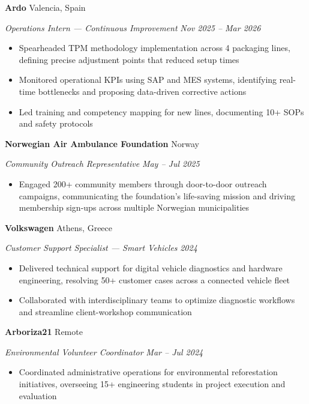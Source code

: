 \documentclass[11pt,letterpaper]{article}
\newcommand{\entry}[4]{%
  \noindent\textbf{#1} \hfill #2 \par\nopagebreak
  \textit{#3} \hfill \textit{#4} \par\nopagebreak
}
\begin{document}
\entry{Ardo}{Valencia, Spain}{Operations Intern --- Continuous Improvement}{Nov 2025 -- Mar 2026}
\begin{itemize}
  \item Spearheaded TPM methodology implementation across 4 packaging lines, defining precise adjustment points that reduced setup times
  \item Monitored operational KPIs using SAP and MES systems, identifying real-time bottlenecks and proposing data-driven corrective actions
  \item Led training and competency mapping for new lines, documenting 10+ SOPs and safety protocols
\end{itemize}
\vspace{0.3em}

\entry{Norwegian Air Ambulance Foundation}{Norway}{Community Outreach Representative}{May -- Jul 2025}
\begin{itemize}
  \item Engaged 200+ community members through door-to-door outreach campaigns, communicating the foundation's life-saving mission and driving membership sign-ups across multiple Norwegian municipalities
\end{itemize}
\vspace{0.3em}

\entry{Volkswagen}{Athens, Greece}{Customer Support Specialist --- Smart Vehicles}{2024}
\begin{itemize}
  \item Delivered technical support for digital vehicle diagnostics and hardware engineering, resolving 50+ customer cases across a connected vehicle fleet
  \item Collaborated with interdisciplinary teams to optimize diagnostic workflows and streamline client-workshop communication
\end{itemize}
\vspace{0.3em}

\entry{Arboriza21}{Remote}{Environmental Volunteer Coordinator}{Mar -- Jul 2024}
\begin{itemize}
  \item Coordinated administrative operations for environmental reforestation initiatives, overseeing 15+ engineering students in project execution and evaluation
\end{itemize}
\vspace{0.3em}

\end{document}

